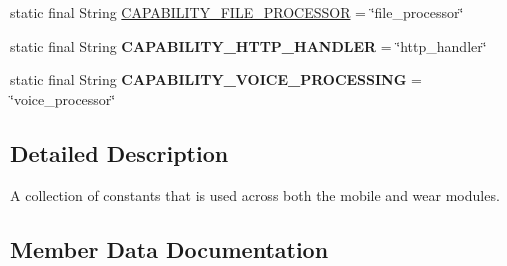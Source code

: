 \begin{DoxyCompactItemize}
\item 
static final String \hyperlink{classcom_1_1example_1_1android_1_1wearable_1_1wcldemo_1_1common_1_1Constants_a011c24d2958f3b1f5cc199e6f7849591}{C\+A\+P\+A\+B\+I\+L\+I\+T\+Y\+\_\+\+F\+I\+L\+E\+\_\+\+P\+R\+O\+C\+E\+S\+S\+OR} = \char`\"{}file\+\_\+processor\char`\"{}
\item 
static final String {\bfseries C\+A\+P\+A\+B\+I\+L\+I\+T\+Y\+\_\+\+H\+T\+T\+P\+\_\+\+H\+A\+N\+D\+L\+ER} = \char`\"{}http\+\_\+handler\char`\"{}\hypertarget{classcom_1_1example_1_1android_1_1wearable_1_1wcldemo_1_1common_1_1Constants_a669105399bb35eb910ba65d61fcb373e}{}\label{classcom_1_1example_1_1android_1_1wearable_1_1wcldemo_1_1common_1_1Constants_a669105399bb35eb910ba65d61fcb373e}

\item 
static final String {\bfseries C\+A\+P\+A\+B\+I\+L\+I\+T\+Y\+\_\+\+V\+O\+I\+C\+E\+\_\+\+P\+R\+O\+C\+E\+S\+S\+I\+NG} = \char`\"{}voice\+\_\+processor\char`\"{}\hypertarget{classcom_1_1example_1_1android_1_1wearable_1_1wcldemo_1_1common_1_1Constants_af59611a81118f78dc57802b7cc909ff6}{}\label{classcom_1_1example_1_1android_1_1wearable_1_1wcldemo_1_1common_1_1Constants_af59611a81118f78dc57802b7cc909ff6}

\end{DoxyCompactItemize}


\subsection{Detailed Description}
A collection of constants that is used across both the mobile and wear modules. 

\subsection{Member Data Documentation}
